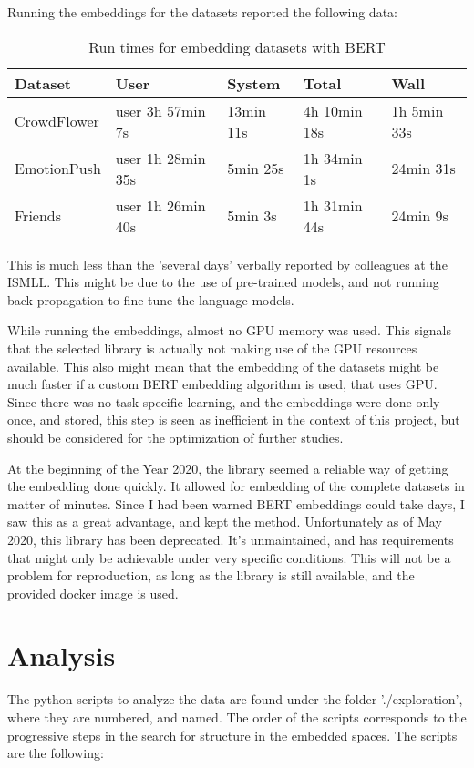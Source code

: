 Running the embeddings for the datasets reported the following data:

\begin{table}[H]
  \begin{tabular}{lllll}
  Dataset                          & User              & System    & Total        & Wall        \\
  \hline
  \multicolumn{1}{l|}{CrowdFlower} & user 3h 57min 7s  & 13min 11s & 4h 10min 18s & 1h 5min 33s \\
  \multicolumn{1}{l|}{EmotionPush} & user 1h 28min 35s & 5min 25s  & 1h 34min 1s &  24min 31s   \\
  \multicolumn{1}{l|}{Friends    } & user 1h 26min 40s & 5min 3s   & 1h 31min 44s & 24min 9s
  \end{tabular}
  \caption{Run times for embedding datasets with BERT}\label{tab:rt_BERT}
\end{table}

This is much less than the 'several days' verbally reported by colleagues at the ISMLL. This might be due to the use of pre-trained models, and not running back-propagation to fine-tune the language models.

While running the embeddings, almost no GPU memory was used. This signals that the selected library is actually not making use of the GPU resources available. This also might mean that the embedding of the datasets might be much faster if a custom BERT embedding algorithm is used, that uses GPU. Since there was no task-specific learning, and the embeddings were done only once, and stored, this step is seen as inefficient in the context of this project, but should be considered for the optimization of further studies.

At the beginning of the Year 2020, the library seemed a reliable way of getting the embedding done quickly. It allowed for embedding of the complete datasets in matter of minutes. Since I had been warned BERT embeddings could take days, I saw this as a great advantage, and kept the method. Unfortunately as of May 2020, this library has been deprecated. It's unmaintained, and has requirements that might only be achievable under very specific conditions. This will not be a problem for reproduction, as long as the library is still available, and the provided docker image is used.

\section{Analysis}\label{sec:Analysis}
The python scripts to analyze the data are found under the folder './exploration', where they are numbered, and named. The order of the scripts corresponds to the progressive steps in the search for structure in the embedded spaces. The scripts are the following:

